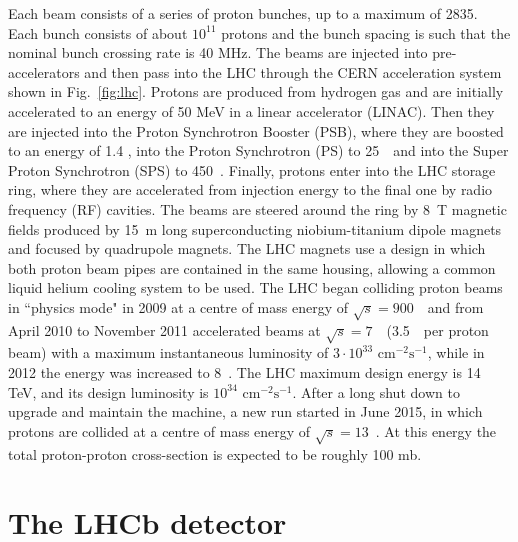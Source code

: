 Each beam consists of a series of proton bunches, up to a maximum of 2835. Each bunch consists of about $10^{11}$
protons and the bunch spacing is such that the nominal bunch crossing rate is 40 MHz. The beams are injected into
pre-accelerators and then pass into the LHC through the CERN acceleration system shown in Fig.~\ref{fig:lhc}. Protons are
produced from hydrogen gas and are initially accelerated to an energy of 50 MeV in a linear accelerator (LINAC).
Then they are injected into the Proton Synchrotron Booster (PSB), where they are boosted to an energy of 1.4 \gev,
into the Proton Synchrotron (PS) to 25~\gev~and into the Super Proton Synchrotron (SPS) to 450~\gev. Finally, protons
enter into the LHC storage ring, where they are accelerated from injection energy to the final one
by radio frequency (RF) cavities. The beams are steered around the ring by 8~T magnetic fields produced by 15~m long
superconducting niobium-titanium dipole magnets and focused by quadrupole magnets. The LHC magnets
use a design in which both proton beam pipes are contained in the same housing, allowing a common liquid helium cooling
system to be used. The LHC began colliding proton beams in ``physics mode" in 2009 at a centre of mass
energy of $\sqrt{s} = 900$~\gev~and from April 2010 to November 2011 accelerated beams at $\sqrt{s} = 7$~\tev~(3.5~\tev~per
proton beam) with a maximum instantaneous luminosity of $3\cdot10^{33} \text{ cm}^{-2}\text{s}^{-1}$, while in
2012 the energy was increased to 8~\tev. The LHC maximum design energy is 14 TeV, and its design
luminosity is $10^{34} \text{ cm}^{-2}\text{s}^{-1}$. After a long shut down to upgrade and maintain the machine, a
new run started in June 2015, in which protons are collided at a centre of mass energy of $\sqrt{s} = 13$~\tev. At this
energy the total proton-proton cross-section is expected to be roughly 100 mb.

\section{The LHCb detector}

